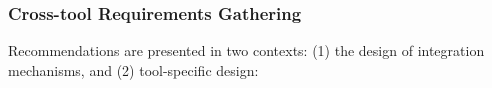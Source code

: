 



\subsubsection{Cross-tool Requirements Gathering}

Recommendations are presented in two contexts: (1) the design of integration mechanisms, and (2) tool-specific design:

